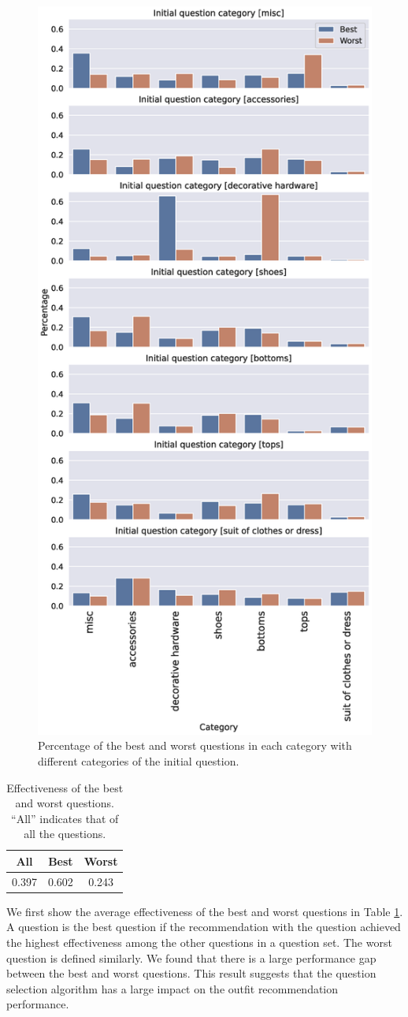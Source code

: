 \begin{figure}
  \centering
  \includegraphics[width=0.6\linewidth]{figures/category_stats_init_long.eps}
  \caption{Percentage of the best and worst questions in each category with different categories of the initial question.}
  \label{category-stats-init}
\end{figure}

\begin{table}[t]
\caption{Effectiveness of the best and worst questions. ``All'' indicates that of all the questions.}
\centering
\begin{tabular}{ccc}
\toprule
 All   & Best & Worst \\ \midrule
 0.397 & 0.602        & 0.243         \\
\bottomrule
\end{tabular}
\label{tb:best_worst}
\end{table}

We first show the average effectiveness of the best and worst questions in Table \ref{tb:best_worst}.
A question is the best question if the recommendation with the question achieved the highest effectiveness among the other questions in a question set. 
The worst question is defined similarly. 
We found that there is a large performance gap between the best and worst questions.
This result suggests that the question selection algorithm has a large impact on the outfit recommendation performance. 

